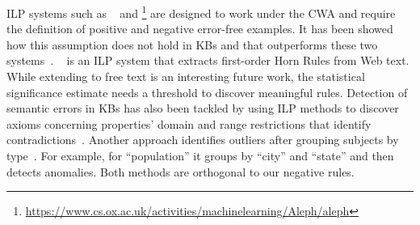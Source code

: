ILP systems such as ~\cite{dehaspe1999discovery} and \footnote{\url{https://www.cs.ox.ac.uk/activities/machinelearning/Aleph/aleph}} are designed to work under the CWA and require the definition of positive and negative error-free examples.
It has been showed how this assumption does not hold in KBs and that  \amie outperforms these two systems~\cite{galarraga2015fast}. 
~\cite{schoenmackers2010learning} is an ILP system that extracts first-order Horn Rules 
from Web text. While extending \krd to free text %
is an interesting future work, the statistical significance estimate needs a threshold to discover meaningful rules. 
Detection of semantic errors in KBs has also been tackled by using ILP methods to discover axioms concerning properties' domain and
range restrictions that identify contradictions~\cite{Topper:2012}. Another approach identifies outliers after grouping subjects by type~\cite{Wienand2014}. For example, for ``population'' it groups by ``city'' and ``state'' and then detects anomalies. Both methods are orthogonal to our negative rules.



